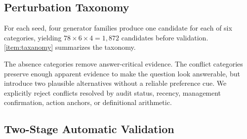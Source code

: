 \documentclass[sigconf,review]{acmart}
\newcommand{\bench}{\textsc{FInject}\xspace}
\begin{document}
\subsection{Perturbation Taxonomy}

For each seed, four generator families produce one candidate for each of six categories, yielding $78 \times 6 \times 4 = 1{,}872$ candidates before validation. \ref{item:taxanomy} summarizes the taxonomy.

 

The absence categories remove answer-critical evidence. The conflict categories preserve enough apparent evidence to make the question look answerable, but introduce two plausible alternatives without a reliable preference cue. We explicitly reject conflicts resolved by audit status, recency, management confirmation, action anchors, or definitional arithmetic.

\subsection{Two-Stage Automatic Validation}
\end{document}
